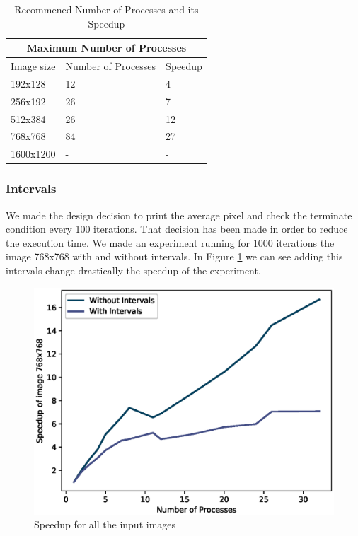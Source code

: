 \documentclass[12pt,a4paper]{article}
\begin{document}
	      \begin{table}[h!]
	       \centering
	       \begin{tabular}{|p{3cm}||p{5cm}|p{3cm}|}
	         \hline
	         \multicolumn{3}{|c|}{Maximum Number of Processes} \\
	         \hline
	         Image size&Number of Processes&Speedup\\
	         \hline
	         192x128&12&4\\
	         256x192&26&7\\
	         512x384&26&12\\
	         768x768&84&27\\
	         1600x1200&-&-\\
	         \hline
	       \end{tabular}
	       \caption{Recommened Number of Processes and its Speedup}
	       \label{tableSpeedup}
	      \end{table}

        \subsubsection{Intervals}
          We made the design decision to print the average pixel and check the terminate condition every 100 iterations. That decision has been made in order to reduce the execution time. We made an experiment running for 1000 iterations the image 768x768 with and without intervals. In Figure \ref{speedupWithInterval} we can see adding this intervals change drastically the speedup of the experiment. 

          \begin{figure}[ht]
              \centering
              \includegraphics[scale=0.6]{../graphs/speedupInterval.eps}
              \caption{Speedup for all the input images}
              \label{speedupWithInterval}
          \end{figure}
\end{document}
